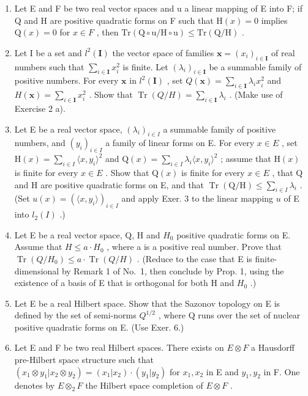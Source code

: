 \begin{enumerate}
\def\labelenumi{\arabic{enumi})}
\setcounter{enumi}{2}
\item
  Let E and F be two real vector spaces and u a linear mapping of E into F; if Q and H are positive quadratic forms on F such that \(\mathrm{H}(x)=0\) implies \(\mathrm{Q}(x)=0\) for \(x\in F\) , then \(\mathrm{Tr}\left(\mathrm{Q}\circ\mathrm{u}/\mathrm{H}\circ\mathrm{u}\right)\leqslant\mathrm{Tr}\left(\mathrm{Q}/\mathrm{H}\right)\) .
\item
  Let I be a set and \(l^2(\mathbf{I})\) the vector space of families \(\mathbf{x} = (x_i)_{i \in \mathbf{I}}\) of real numbers such that \(\sum_{i \in \mathbf{I}} x_i^2\) is finite. Let \((\lambda_i)_{i \in \mathbf{I}}\) be a summable family of positive numbers. For every \(\mathbf{x}\) in \(l^2(\mathbf{I})\) , set \(Q(\mathbf{x}) = \sum_{i \in \mathbf{I}} \lambda_i x_i^2\) and \(H(\mathbf{x}) = \sum_{i \in \mathbf{I}} x_i^2\) . Show that \(\operatorname{Tr}(Q / H) = \sum_{i \in \mathbf{I}} \lambda_i\) . (Make use of Exercise 2 a).
\item
  Let E be a real vector space, \((\lambda_i)_{i \in I}\) a summable family of positive numbers, and \((y_i)_{i \in I}\) a family of linear forms on E. For every \(x \in E\) , set \(\mathrm{H}(x) = \sum_{i \in I} \langle x, y_i \rangle^2\) and \(\mathrm{Q}(x) = \sum_{i \in I} \lambda_i \langle x, y_i \rangle^2\) ; assume that \(\mathrm{H}(x)\) is finite for every \(x \in E\) . Show that \(\mathrm{Q}(x)\) is finite for every \(x \in E\) , that Q and H are positive quadratic forms on E, and that \(\operatorname{Tr}(\mathrm{Q}/\mathrm{H}) \leqslant \sum_{i \in I} \lambda_i\) . (Set \(u(x) = (\langle x, y_i \rangle)_{i \in I}\) and apply Exer. 3 to the linear mapping \(u\) of E into \(l_2(I)\) .)
\item
  Let E be a real vector space, Q, H and \(H_{0}\) positive quadratic forms on E. Assume that \(H \leqslant a \cdot H_{0}\) , where a is a positive real number. Prove that \(\operatorname{Tr}(Q/H_{0}) \leqslant a \cdot \operatorname{Tr}(Q/H)\) . (Reduce to the case that E is finite-dimensional by Remark 1 of No.~1, then conclude by Prop. 1, using the existence of a basis of E that is orthogonal for both H and \(H_{0}\) .)
\item
  Let E be a real Hilbert space. Show that the Sazonov topology on E is defined by the set of semi-norms \(Q^{1/2}\) , where Q runs over the set of nuclear positive quadratic forms on E. (Use Exer. 6.)
\item
  Let E and F be two real Hilbert spaces. There exists on \(E \otimes F\) a Hausdorff pre-Hilbert space structure such that \((x_{1} \otimes y_{1}|x_{2} \otimes y_{2}) = (x_{1}|x_{2}) \cdot (y_{1}|y_{2})\) for \(x_{1}, x_{2}\) in E and \(y_{1}, y_{2}\) in F. One denotes by \(E \otimes_{2} F\) the Hilbert space completion of \(E \otimes F\) .
\end{enumerate}


